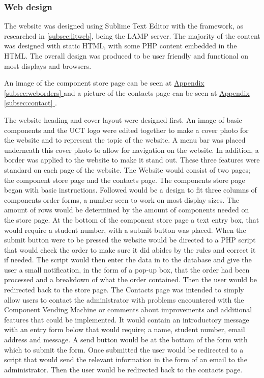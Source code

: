 \documentclass[a4paper,11pt]{article}
\newcommand*{\fullref}[1]{\hyperref[{#1}]{\Appendixautorefname  \ref*{#1} \nameref*{#1}}}
\newcommand*{\Appendixautorefname}{Appendix }
\numberwithin{figure}{section}
\numberwithin{table}{section}
\begin{document}
\subsubsection{Web design}
\label{subsubsec:webdev}

The website was designed using Sublime Text Editor with the framework, as researched in \autoref{subsec:litweb}, being the LAMP server. The majority of the content was designed with static HTML, with some PHP content embedded in the HTML. The overall design was produced to be user friendly and functional on most displays and browsers.

An image of the component store page can be seen at \fullref{subsec:weborders} and a picture of the contacts page can be seen at \fullref{subsec:contact}.

The website heading and cover layout were designed first. An image of basic components and the UCT logo were edited together to make a cover photo for the website and to represent the topic of the website. A menu bar was placed underneath this cover photo to allow for navigation on the website. In addition, a border was applied to the website to make it stand out. These three features were standard on each page of the website. The Website would consist of two pages; the component store page and the contacts page. The components store page began with basic instructions. Followed would be a design to fit three columns of components order forms, a number seen to work on most display sizes. The amount of rows would be determined by the amount of components needed on the store page. At the bottom of the component store page a text entry box, that would require a student number, with a submit button was placed. When the submit button were to be pressed the website would be directed to a PHP script that would check the order to make sure it did abides by the rules and correct it if needed. The script would then enter the data in to the database and give the user a small notification, in the form of a pop-up box, that the order had been processed and a breakdown of what the order contained. Then the user would be redirected back to the store page. The Contacts page was intended to simply allow users to contact the administrator with problems encountered with the Component Vending Machine or comments about improvements and additional features that could be implemented. It would contain an introductory message with an entry form below that would require; a name, student number, email address and message. A send button would be at the bottom of the form with which to submit the form. Once submitted the user would be redirected to a script that would send the relevant information in the form of an email to the administrator. Then the user would be redirected back to the contacts page.
\end{document}
